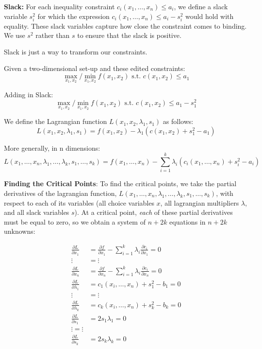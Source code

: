 \documentclass[
]{book}
\theoremstyle{definition}
\theoremstyle{definition}
\theoremstyle{definition}
\theoremstyle{definition}
\theoremstyle{remark}
\begin{document}
\textbf{Slack:} For each inequality constraint \(c_i(x_1, \dots, x_n) \leq a_i\), we define a slack variable \(s_i^2\) for which the expression \(c_i(x_1, \dots, x_n) \leq a_i - s_i^2\) would hold with equality. These slack variables capture how close the constraint comes to binding. We use \(s^2\) rather than \(s\) to ensure that the slack is positive.

Slack is just a way to transform our constraints.

Given a two-dimensional set-up and these edited constraints:
\[\max_{x_1,x_2}/\min_{x_1,x_2} f(x_1,x_2) \text{ s.t. } c(x_1,x_2) \le a_1\]

Adding in Slack:
\[\max_{x_1,x_2}/\min_{x_1,x_2} f(x_1,x_2) \text{ s.t. } c(x_1,x_2) \le a_1 - s_1^2\]

We define the Lagrangian function \(L(x_1,x_2,\lambda_1,s_1)\) as follows:
\[L(x_1,x_2,\lambda_1,s_1) = f(x_1,x_2) - \lambda_1 ( c(x_1,x_2) + s_1^2 - a_1)\]

More generally, in n dimensions:
\[ L(x_1, \dots, x_n, \lambda_1, \dots, \lambda_k, s_1, \dots, s_k) = f(x_1, \dots, x_n) - \sum_{i = 1}^k \lambda_i(c_i(x_1,\dots, x_n) + s_i^2 - a_i)\]

\textbf{Finding the Critical Points}: To find the critical points, we take the partial derivatives of the lagrangian function, \(L(x_1,\dots,x_n,\lambda_1,\dots,\lambda_k,s_1,\dots,s_k)\), with respect to each of its variables (all choice variables \(x\), all lagrangian multipliers \(\lambda\), and all slack variables \(s\)). At a critical point, \emph{each} of these partial derivatives must be equal to zero, so we obtain a system of \(n + 2k\) equations in \(n + 2k\) unknowns:

\begin{align*}
\frac{\partial L}{\partial x_1} &= \frac{\partial f}{\partial x_1} - \sum_{i = 1}^k\lambda_i\frac{\partial c_i}{\partial x_1} = 0\\
 \vdots & =  \vdots  \\
\frac{\partial L}{\partial x_n}  &= \frac{\partial f}{\partial x_n} - \sum_{i = 1}^k\lambda_i\frac{\partial c_i}{\partial x_n} = 0\\
\frac{\partial L}{\partial \lambda_1} &= c_1(x_i, \dots, x_n) + s_1^2 - b_1 = 0\\
 \vdots & = \vdots \\
\frac{\partial L}{\partial \lambda_k} &= c_k(x_i, \dots, x_n) + s_k^2 - b_k = 0\\
\frac{\partial L}{\partial s_1} &= 2s_1\lambda_1 = 0\\
 \vdots =\vdots \\
\frac{\partial L}{\partial s_k} &= 2s_k\lambda_k = 0
\end{align*}
\end{document}

